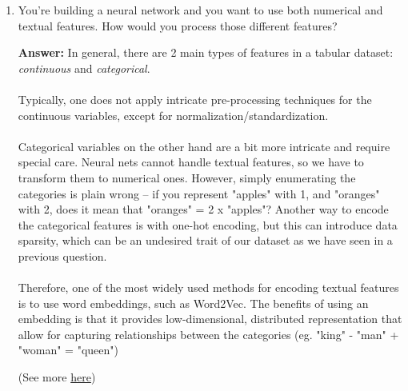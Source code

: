 \documentclass{article}
\newenvironment{QandA}{\begin{enumerate}[label=\arabic*.]}{\end{enumerate}}
\newenvironment{answer}{\par\normalfont \textbf{Answer:}}{}
\begin{document}
\begin{QandA}
    \item You’re building a neural network and you want to use both numerical and textual features. How would you process those different features?
    \begin{answer}
        In general, there are 2 main types of features in a tabular dataset: \textit{continuous} and \textit{categorical}. \\\\
        Typically, one does not apply intricate pre-processing techniques for the continuous variables, except for normalization/standardization. \\\\
        Categorical variables on the other hand are a bit more intricate and require special care. Neural nets cannot handle textual features, so we have to transform them to numerical ones. However, simply enumerating the categories is plain wrong -- if you represent "apples" with 1, and "oranges" with 2, does it mean that "oranges" = 2 x "apples"? Another way to encode the categorical features is with one-hot encoding, but this can introduce data sparsity, which can be an undesired trait of our dataset as we have seen in a previous question. \\\\
        Therefore, one of the most widely used methods for encoding textual features is to use word embeddings, such as Word2Vec. The benefits of using an embedding is that it provides low-dimensional, distributed representation that allow for capturing relationships between the categories (eg. "king" - "man" + "woman" = "queen")

        (See more \href{https://www.fast.ai/2018/04/29/categorical-embeddings/}{here})
    \end{answer}


\end{QandA}
\end{document}
